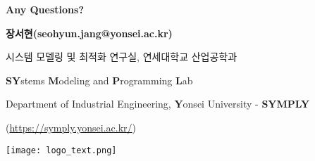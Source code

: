 \documentclass[xcolor=dvipsnames,t,9pt]{beamer}
\begin{document}
\begin{frame}{15}
\end{frame}

{
\begin{frame}[c,noframenumbering]
    \vfill
    \huge{\centerline{\textbf{Any Questions?}}}
    \bigskip
    {\normalsize 
    \centerline{\textbf{장서현(seohyun.jang@yonsei.ac.kr)}}\bigskip
    }
    {\footnotesize
    \centerline{시스템 모델링 및 최적화 연구실, 연세대학교 산업공학과}\bigskip

    \centerline{\textbf{SY}stems \textbf{M}odeling and \textbf{P}rogramming \textbf{L}ab}
    \centerline{Department of Industrial Engineering, \textbf{Y}onsei University - \textbf{SYMPLY}}
    \centerline{(\url{https://symply.yonsei.ac.kr/})}
    }
    \bigskip
    \centerline{\texttt{[image: logo\_text.png]}}
\end{frame}
}

% 
% 

\end{document}
